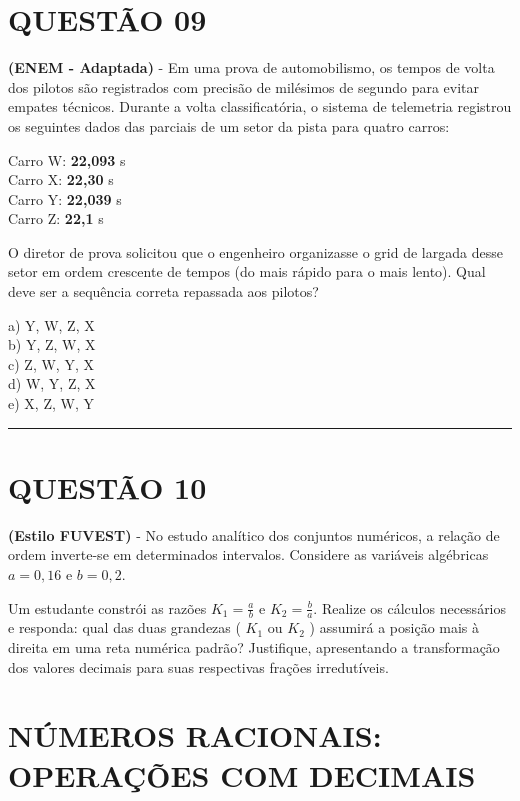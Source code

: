 \documentclass[12pt, a4paper]{article}
\begin{document}
\section*{QUESTÃO 09}

\textbf{(ENEM - Adaptada)} - Em uma prova de automobilismo, os tempos de volta dos pilotos são registrados com precisão de milésimos de segundo para evitar empates técnicos. Durante a volta classificatória, o sistema de telemetria registrou os seguintes dados das parciais de um setor da pista para quatro carros:

Carro W: \textbf{22,093} s\\[0.3cm]
Carro X: \textbf{22,30} s\\[0.3cm]
Carro Y: \textbf{22,039} s\\[0.3cm]
Carro Z: \textbf{22,1} s

O diretor de prova solicitou que o engenheiro organizasse o grid de largada desse setor em ordem crescente de tempos (do mais rápido para o mais lento). Qual deve ser a sequência correta repassada aos pilotos?

a) Y, W, Z, X\\[0.3cm]
b) Y, Z, W, X\\[0.3cm]
c) Z, W, Y, X\\[0.3cm]
d) W, Y, Z, X\\[0.3cm]
e) X, Z, W, Y

\vspace{0.5cm} \noindent\rule{\textwidth}{0.4pt} \vspace{0.5cm}

\section*{QUESTÃO 10}

\textbf{(Estilo FUVEST)} - No estudo analítico dos conjuntos numéricos, a relação de ordem inverte-se em determinados intervalos. Considere as variáveis algébricas  $ a = 0,16 $  e  $ b = 0,2 $.

Um estudante constrói as razões  $ K_1 = \frac{a}{b} $  e  $ K_2 = \frac{b}{a} $. Realize os cálculos necessários e responda: qual das duas grandezas ( $ K_1 $  ou  $ K_2 $ ) assumirá a posição mais à direita em uma reta numérica padrão? Justifique, apresentando a transformação dos valores decimais para suas respectivas frações irredutíveis.

\section*{NÚMEROS RACIONAIS: OPERAÇÕES COM DECIMAIS}
\end{document}
